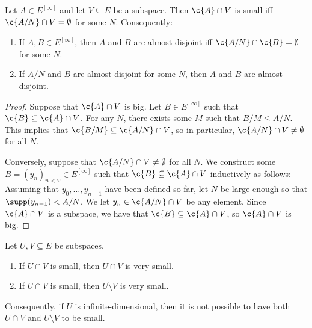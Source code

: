 \documentclass[11pt,reqno]{amsart}
\begin{document}
\begin{lemma}
\label{lem:ad.iff.tail.disjoint}
    Let $A \in E^{[\infty]}$ and let $V \subseteq E$ be a subspace. Then $\c{A} \cap V$ is small iff $\c{A/N} \cap V = \emptyset$ for some $N$. Consequently:
    \begin{enumerate}
        \item If $A,B \in E^{[\infty]}$, then $A$ and $B$ are almost disjoint iff $\c{A/N} \cap \c{B} = \emptyset$ for some $N$.

        \item If $A/N$ and $B$ are almost disjoint for some $N$, then $A$ and $B$ are almost disjoint.
    \end{enumerate}
\end{lemma}

\begin{proof}
    Suppose that $\c{A} \cap V$ is big. Let $B \in E^{[\infty]}$ such that $\c{B} \subseteq \c{A} \cap V$. For any $N$, there exists some $M$ such that $B/M \leq A/N$. This implies that $\c{B/M} \subseteq \c{A/N} \cap V$, so in particular, $\c{A/N} \cap V \neq \emptyset$ for all $N$.

    Conversely, suppose that $\c{A/N} \cap V \neq \emptyset$ for all $N$. We construct some $B = (y_n)_{n<\omega} \in E^{[\infty]}$ such that $\c{B} \subseteq \c{A} \cap V$ inductively as follows: Assuming that $y_0,\dots,y_{n-1}$ have been defined so far, let $N$ be large enough so that $\supp(y_{n-1}) < A/N$. We let $y_n \in \c{A/N} \cap V$ be any element. Since $\c{A} \cap V$ is a subspace, we have that $\c{B} \subseteq \c{A} \cap V$, so $\c{A} \cap V$ is big.
\end{proof}

\begin{lemma}
\label{lem:ad.is.very.small}
    Let $U,V \subseteq E$ be subspaces.
    \begin{enumerate}
        \item If $U \cap V$ is small, then $U \cap V$ is very small.

        \item If $U \cap V$ is small, then $U \setminus V$ is very small.
    \end{enumerate}
    Consequently, if $U$ is infinite-dimensional, then it is not possible to have both $U \cap V$ and $U \setminus V$ to be small.
\end{lemma}
\end{document}
